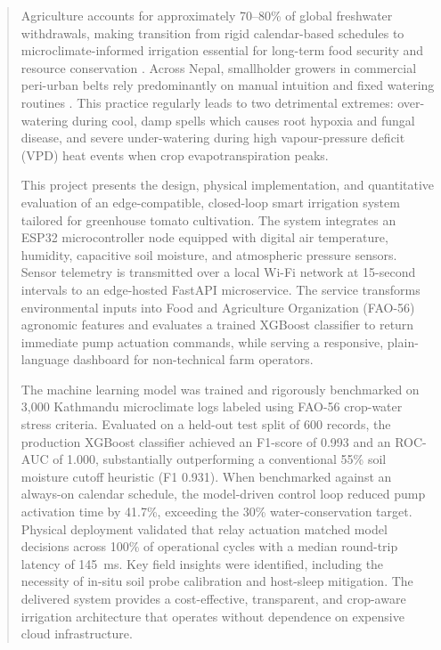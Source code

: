 \documentclass[12pt, a4paper]{article}
\begin{document}
\begin{abstract}
Agriculture accounts for approximately 70--80\% of global freshwater withdrawals, making transition from rigid calendar-based schedules to microclimate-informed irrigation essential for long-term food security and resource conservation \citep{almulla2022,liu2023}. Across Nepal, smallholder growers in commercial peri-urban belts rely predominantly on manual intuition and fixed watering routines \citep{kunwar2024}. This practice regularly leads to two detrimental extremes: over-watering during cool, damp spells which causes root hypoxia and fungal disease, and severe under-watering during high vapour-pressure deficit (VPD) heat events when crop evapotranspiration peaks. 

This project presents the design, physical implementation, and quantitative evaluation of an edge-compatible, closed-loop smart irrigation system tailored for greenhouse tomato cultivation. The system integrates an ESP32 microcontroller node equipped with digital air temperature, humidity, capacitive soil moisture, and atmospheric pressure sensors. Sensor telemetry is transmitted over a local Wi-Fi network at 15-second intervals to an edge-hosted FastAPI microservice. The service transforms environmental inputs into Food and Agriculture Organization (FAO-56) agronomic features and evaluates a trained XGBoost classifier to return immediate pump actuation commands, while serving a responsive, plain-language dashboard for non-technical farm operators.

The machine learning model was trained and rigorously benchmarked on 3{,}000 Kathmandu microclimate logs labeled using FAO-56 crop-water stress criteria. Evaluated on a held-out test split of 600 records, the production XGBoost classifier achieved an F1-score of 0.993 and an ROC-AUC of 1.000, substantially outperforming a conventional 55\% soil moisture cutoff heuristic (F1 0.931). When benchmarked against an always-on calendar schedule, the model-driven control loop reduced pump activation time by 41.7\%, exceeding the 30\% water-conservation target. Physical deployment validated that relay actuation matched model decisions across 100\% of operational cycles with a median round-trip latency of 145~ms. Key field insights were identified, including the necessity of in-situ soil probe calibration and host-sleep mitigation. The delivered system provides a cost-effective, transparent, and crop-aware irrigation architecture that operates without dependence on expensive cloud infrastructure.
\end{abstract}
\end{document}

